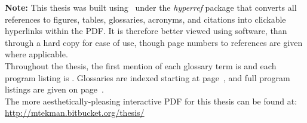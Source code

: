 \documentclass[11pt]{report} %
\newif\ifcolourmode
\begin{document}
\begin{spacing}{1.1}

\setcounter{page}{2}




{\noindent \textbf{Note:} This thesis was built using \LaTeXe\  under the \textit{hyperref} package that converts all references to figures, tables, glossaries, acronyms, and citations into clickable hyperlinks within the PDF. It is therefore better viewed using software, than through a hard copy for ease of use, though page numbers to references are given where applicable.}\\

\ifcolourmode

	{\noindent Throughout the thesis, the first mention of each glossary term and program listing is marked in blue, and links to an index. Glossaries are indexed starting at page~\pageref{ref:main:gloss}, and full program listings are given on page~\pageref{ref:meth:proglist}.}\\

\else

	{\noindent Throughout the thesis, the first mention of each glossary term is {} and each  program listing is {}. Glossaries are indexed starting at page~\pageref{ref:main:gloss}, and full program listings are given on page~\pageref{ref:meth:proglist}.}\\
	
	{\noindent The more aesthetically-pleasing interactive PDF for this thesis can be found at:\\
\url{http://mtekman.bitbucket.org/thesis/}}

\fi








	\begin{spacing}{1.2}

	\end{spacing}

\pagebreak
	\begin{spacing}{1.2}
	\tableofcontents
	\end{spacing}
\end{spacing}

\endgroup





\pagebreak
\end{document}
